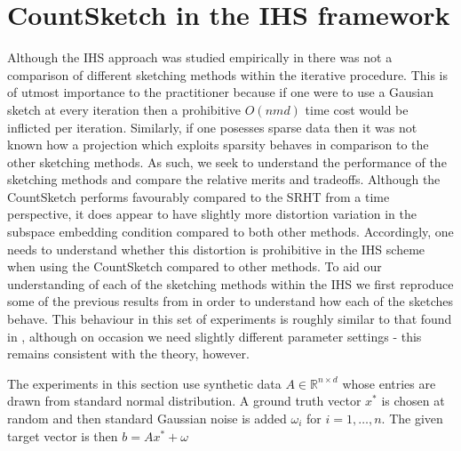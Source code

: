 \documentclass[twoside]{article}
\newcommand{\R}{\mathbb{R}}
\theoremstyle{definition}\newtheorem{thm}{Theorem}[section]
\theoremstyle{definition}\newtheorem{mydef}[thm]{Definition}
\theoremstyle{definition}\newtheorem{rem}[thm]{Remark}
\theoremstyle{definition}\newtheorem{prop}[thm]{Proposition}
\theoremstyle{definition}\newtheorem{example}[thm]{Example}
\theoremstyle{definition}\newtheorem{claim}[thm]{Claim}
\theoremstyle{definition}\newtheorem{Qu}[thm]{Question}
\theoremstyle{definition}\newtheorem{Lemma}[thm]{Lemma}
\theoremstyle{definition}\newtheorem{Cor}[thm]{Corollary}
\theoremstyle{definition}\newtheorem{Fact}[]{Fact}
\begin{document}
\section{CountSketch in the IHS framework} \label{sec: countsketch-ihs}

Although the IHS approach was studied empirically in \cite{pilanci2016iterative}
there was not a comparison of different sketching methods within the iterative
procedure.
This is of utmost importance to the practitioner because if one were to use a
Gausian sketch at every iteration then a prohibitive $O(nmd)$ time cost
would be inflicted per iteration.
Similarly, if one posesses sparse data then it was not known how a projection
which exploits sparsity behaves in comparison to the other sketching methods.
As such, we seek to understand the performance of the sketching methods
and compare the relative merits and tradeoffs.
Although the CountSketch performs favourably compared to the SRHT from a time
perspective, it does appear to have slightly more distortion variation in the
subspace embedding condition compared to both other methods.
Accordingly, one needs to understand whether this distortion is prohibitive in
the IHS scheme when using the CountSketch compared to other methods.
To aid our understanding of each of the sketching methods within the IHS we
first
reproduce some of the previous results from \cite{pilanci2016iterative} in order
to understand how each of the sketches behave.
This behaviour in this set of experiments is roughly similar to that found in
\cite{pilanci2016iterative}, although on occasion we need slightly different
parameter settings - this remains consistent with the theory, however.

The experiments in this section use synthetic data $A \in \R^{n \times d}$
whose entries are drawn from standard normal distribution.
A ground truth vector $x^*$ is chosen at random and then standard Gaussian
noise is added $\omega_i$ for $i=1, \ldots, n$.
The given target vector is then $b = Ax^* + \omega$
\end{document}
